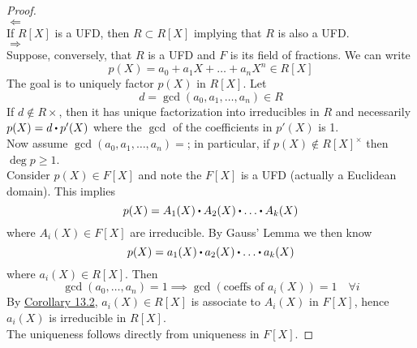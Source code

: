 \documentclass[../Main.tex]{subfiles}
\begin{document}
\begin{proof}~\\
	$\Leftarrow$\\
	If $R[X]$ is a UFD, then $R\subset R[X]$ implying that $R$ is also a UFD.\\
	$\Rightarrow$\\
	Suppose, conversely, that $R$ is a UFD and $F$ is its field of fractions. We can write
	\[p(X) =a_0+a_1X+\dots+a_nX^n\in R[X]\]
	The goal is to uniquely factor $p(X)$ in $R[X]$. Let
	\[d=\gcd(a_0,a_1,\dots,a_n)\in R\]
	If $d\notin R\times$, then it has unique factorization into irreducibles in $R$ and necessarily $p(X) = d\rdot p'(X)$ where the $\gcd$ of the coefficients in $p'(X)$ is 1. \\
	Now assume $\gcd(a_0,a_1,\dots,a_n)=$; in particular, if $p(X)\notin R[X]^\times$ then $\deg p\ge 1$.\\
	Consider $p(X)\in F[X]$ and note the $F[X]$ is a UFD (actually a Euclidean domain). This implies 
	\[p(X)=A_1(X)\rdot A_2(X)\rdot \dots \rdot A_k(X)\]
	where $A_i(X)\in F[X]$ are irreducible. By Gauss' Lemma we then know
	\[p(X)=a_1(X)\rdot a_2(X)\rdot \dots \rdot a_k(X)\]
	where $a_i(X)\in R[X]$. Then
	\[\gcd(a_0,\dots,a_n)=1 \implies \gcd(\text{coeffs of }a_i(X))=1\quad \forall i\]
	By \hyperref[co:13.2]{Corollary 13.2}, $a_i(X)\in R[X]$ is associate to $A_i(X)$ in $F[X]$, hence $a_i(X)$ is irreducible in $R[X]$.\\
	The uniqueness follows directly from uniqueness in $F[X]$.
\end{proof}
\end{document}
